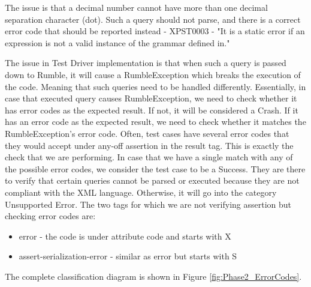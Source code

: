 

The issue is that a decimal number cannot have more than one decimal separation character (dot). Such a query should not parse, and there is a correct error code that should be reported instead - XPST0003 - "It is a static error if an expression is not a valid instance of the grammar defined in." 

The issue in Test Driver implementation is that when such a query is passed down to Rumble, it will cause a RumbleException which breaks the execution of the code. Meaning that such queries need to be handled differently. Essentially, in case that executed query causes RumbleException, we need to check whether it has error codes as the expected result. If not, it will be considered a Crash. If it has an error code as the expected result, we need to check whether it matches the RumbleException's error code. Often, test cases have several error codes that they would accept under any-off assertion in the result tag. This is exactly the check that we are performing. In case that we have a single match with any of the possible error codes, we consider the test case to be a Success. They are there to verify that certain queries cannot be parsed or executed because they are not compliant with the XML language. Otherwise, it will go into the category Unsupported Error. The two tags for which we are not verifying assertion but checking error codes are:
\begin{itemize}
	\item error - the code is under attribute code and starts with X
	\item assert-serialization-error - similar as error but starts with S
\end{itemize}
The complete classification diagram is shown in Figure \ref{fig:Phase2_ErrorCodes}.

